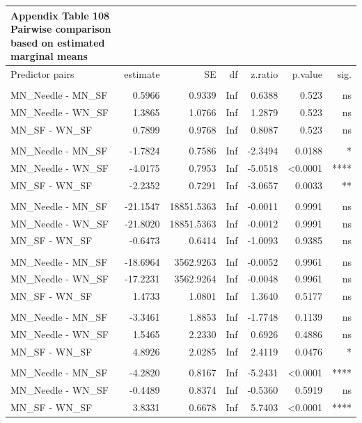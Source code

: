 \documentclass[
  12pt,
  letterpaper,
]{article}
\begin{document}
\begingroup
\fontsize{12.0pt}{14.4pt}\selectfont
\begin{longtable}{l|rrrrrr}
\caption*{
{\large \textbf{Appendix Table 108}} \\ 
{\small \textbf{Pairwise comparison based on estimated marginal means}}
} \\ 
\toprule
Predictor pairs & {estimate} & {SE} & {df} & {z.ratio} & {p.value} & {sig.} \\ 
\midrule\addlinespace[2.5pt]
\multicolumn{7}{l}{Brain} \\[2.5pt] 
\midrule\addlinespace[2.5pt]
MN\_Needle - MN\_SF & 0.5966 & 0.9339 & Inf & 0.6388 & 0.523 & ns \\ 
MN\_Needle - WN\_SF & 1.3865 & 1.0766 & Inf & 1.2879 & 0.523 & ns \\ 
MN\_SF - WN\_SF & 0.7899 & 0.9768 & Inf & 0.8087 & 0.523 & ns \\ 
\midrule\addlinespace[2.5pt]
\multicolumn{7}{l}{Ear} \\[2.5pt] 
\midrule\addlinespace[2.5pt]
MN\_Needle - MN\_SF & -1.7824 & 0.7586 & Inf & -2.3494 & 0.0188 & * \\ 
MN\_Needle - WN\_SF & -4.0175 & 0.7953 & Inf & -5.0518 & <0.0001 & **** \\ 
MN\_SF - WN\_SF & -2.2352 & 0.7291 & Inf & -3.0657 & 0.0033 & ** \\ 
\midrule\addlinespace[2.5pt]
\multicolumn{7}{l}{Eye} \\[2.5pt] 
\midrule\addlinespace[2.5pt]
MN\_Needle - MN\_SF & -21.1547 & 18851.5363 & Inf & -0.0011 & 0.9991 & ns \\ 
MN\_Needle - WN\_SF & -21.8020 & 18851.5363 & Inf & -0.0012 & 0.9991 & ns \\ 
MN\_SF - WN\_SF & -0.6473 & 0.6414 & Inf & -1.0093 & 0.9385 & ns \\ 
\midrule\addlinespace[2.5pt]
\multicolumn{7}{l}{Liver} \\[2.5pt] 
\midrule\addlinespace[2.5pt]
MN\_Needle - MN\_SF & -18.6964 & 3562.9263 & Inf & -0.0052 & 0.9961 & ns \\ 
MN\_Needle - WN\_SF & -17.2231 & 3562.9264 & Inf & -0.0048 & 0.9961 & ns \\ 
MN\_SF - WN\_SF & 1.4733 & 1.0801 & Inf & 1.3640 & 0.5177 & ns \\ 
\midrule\addlinespace[2.5pt]
\multicolumn{7}{l}{Paw} \\[2.5pt] 
\midrule\addlinespace[2.5pt]
MN\_Needle - MN\_SF & -3.3461 & 1.8853 & Inf & -1.7748 & 0.1139 & ns \\ 
MN\_Needle - WN\_SF & 1.5465 & 2.2330 & Inf & 0.6926 & 0.4886 & ns \\ 
MN\_SF - WN\_SF & 4.8926 & 2.0285 & Inf & 2.4119 & 0.0476 & * \\ 
\midrule\addlinespace[2.5pt]
\multicolumn{7}{l}{Spleen} \\[2.5pt] 
\midrule\addlinespace[2.5pt]
MN\_Needle - MN\_SF & -4.2820 & 0.8167 & Inf & -5.2431 & <0.0001 & **** \\ 
MN\_Needle - WN\_SF & -0.4489 & 0.8374 & Inf & -0.5360 & 0.5919 & ns \\ 
MN\_SF - WN\_SF & 3.8331 & 0.6678 & Inf & 5.7403 & <0.0001 & **** \\ 
\bottomrule
\end{longtable}
\endgroup
\end{document}
